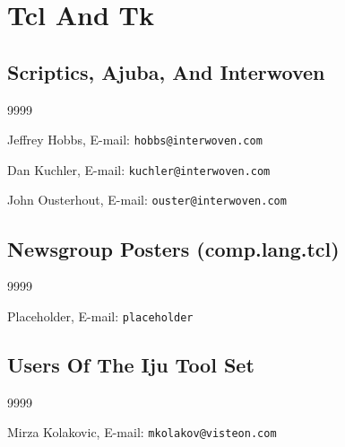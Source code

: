 
\section*{Tcl And Tk}

\subsection*{Scriptics, Ajuba, And Interwoven}

\begin{thecustombibliography}{9999}

Jeffrey Hobbs,
E-mail: \texttt{hobbs@interwoven.com}

Dan Kuchler,
E-mail: \texttt{kuchler@interwoven.com}

John Ousterhout,
E-mail: \texttt{ouster@interwoven.com}

\end{thecustombibliography}


\subsection*{Newsgroup Posters (comp.lang.tcl)}

\begin{thecustombibliography}{9999}

Placeholder,
E-mail: \texttt{placeholder}

\end{thecustombibliography}


\subsection*{Users Of The Iju Tool Set}

\begin{thecustombibliography}{9999}

Mirza Kolakovic,
E-mail: \texttt{mkolakov@visteon.com}

\end{thecustombibliography}

